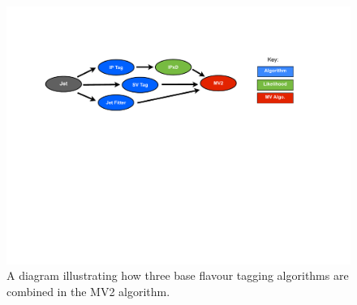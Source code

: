\begin{figure}[!htb]
  \begin{center}
    \includegraphics[width=1.0\textwidth]{figs/Objects/MV2_schem.pdf}
    \caption{A diagram illustrating how three base flavour tagging algorithms are combined in the MV2 algorithm.}
    \label{fig:obj-MV2_schem}
  \end{center}
  \vspace{-1cm}
\end{figure}

